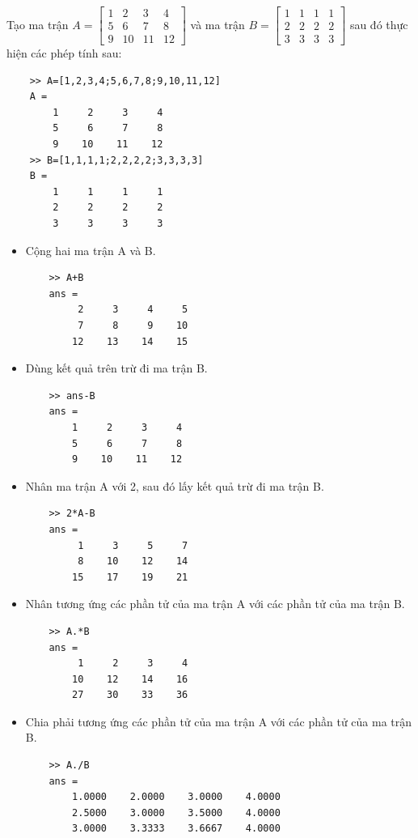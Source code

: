 \documentclass[12pt,a4paper]{article}
\begin{document}
\begin{example}
Tạo ma trận $A=\begin{bmatrix} 1 & 2 & 3 & 4 \\ 5 & 6 & 7 & 8 \\ 9 & 10 & 11 & 12 \end{bmatrix}$ và ma trận $B=\begin{bmatrix} 1 & 1 & 1 & 1 \\ 2 & 2 & 2 & 2 \\ 3 & 3 & 3 & 3 \end{bmatrix}$ sau đó thực hiện các phép tính sau:
\begin{lstlisting}
	>> A=[1,2,3,4;5,6,7,8;9,10,11,12]
	A =
     	1     2     3     4
     	5     6     7     8
     	9    10    11    12
	>> B=[1,1,1,1;2,2,2,2;3,3,3,3]
	B =
     	1     1     1     1
     	2     2     2     2
     	3     3     3     3
\end{lstlisting}
\begin{itemize}
	\item Cộng hai ma trận A và B.
\begin{lstlisting}
	>> A+B
	ans =
     	 2     3     4     5
     	 7     8     9    10
    	12    13    14    15
\end{lstlisting}
	\item Dùng kết quả trên trừ đi ma trận B.
\begin{lstlisting}
	>> ans-B
	ans =
     	1     2     3     4
     	5     6     7     8
     	9    10    11    12
\end{lstlisting}
	\item Nhân ma trận A với 2, sau đó lấy kết quả trừ đi ma trận B.
\begin{lstlisting}
	>> 2*A-B
	ans =
     	 1     3     5     7
     	 8    10    12    14
    	15    17    19    21
\end{lstlisting}
	\item Nhân tương ứng các phần tử của ma trận A với các phần tử của ma trận B.
\begin{lstlisting}
	>> A.*B
	ans =
     	 1     2     3     4
    	10    12    14    16
    	27    30    33    36
\end{lstlisting}
	\item Chia phải tương ứng các phần tử của ma trận A với các phần tử của ma trận B.
\begin{lstlisting}
	>> A./B
	ans =
    	1.0000    2.0000    3.0000    4.0000
    	2.5000    3.0000    3.5000    4.0000
    	3.0000    3.3333    3.6667    4.0000
\end{lstlisting}

\end{itemize}
\end{example}
\end{document}

